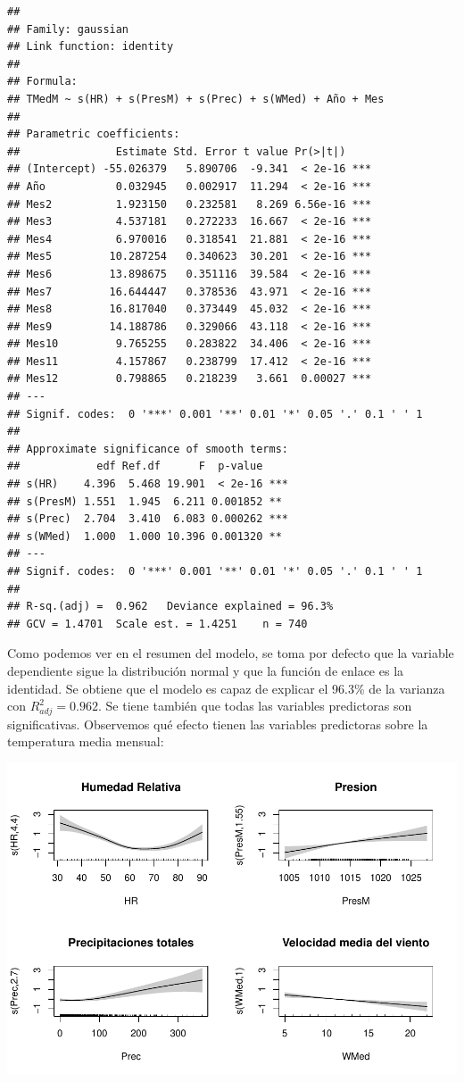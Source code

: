 \documentclass[12pt,a4paper,]{book}
\numberwithin{dummy}{section}
\theoremstyle{ocrenumbox}
\theoremstyle{blacknumex}
\theoremstyle{blacknumbox}
\theoremstyle{ocrenum}
\theoremstyle{ocrenum}
\begin{document}
\begin{verbatim}
## 
## Family: gaussian 
## Link function: identity 
## 
## Formula:
## TMedM ~ s(HR) + s(PresM) + s(Prec) + s(WMed) + Año + Mes
## 
## Parametric coefficients:
##               Estimate Std. Error t value Pr(>|t|)    
## (Intercept) -55.026379   5.890706  -9.341  < 2e-16 ***
## Año           0.032945   0.002917  11.294  < 2e-16 ***
## Mes2          1.923150   0.232581   8.269 6.56e-16 ***
## Mes3          4.537181   0.272233  16.667  < 2e-16 ***
## Mes4          6.970016   0.318541  21.881  < 2e-16 ***
## Mes5         10.287254   0.340623  30.201  < 2e-16 ***
## Mes6         13.898675   0.351116  39.584  < 2e-16 ***
## Mes7         16.644447   0.378536  43.971  < 2e-16 ***
## Mes8         16.817040   0.373449  45.032  < 2e-16 ***
## Mes9         14.188786   0.329066  43.118  < 2e-16 ***
## Mes10         9.765255   0.283822  34.406  < 2e-16 ***
## Mes11         4.157867   0.238799  17.412  < 2e-16 ***
## Mes12         0.798865   0.218239   3.661  0.00027 ***
## ---
## Signif. codes:  0 '***' 0.001 '**' 0.01 '*' 0.05 '.' 0.1 ' ' 1
## 
## Approximate significance of smooth terms:
##            edf Ref.df      F  p-value    
## s(HR)    4.396  5.468 19.901  < 2e-16 ***
## s(PresM) 1.551  1.945  6.211 0.001852 ** 
## s(Prec)  2.704  3.410  6.083 0.000262 ***
## s(WMed)  1.000  1.000 10.396 0.001320 ** 
## ---
## Signif. codes:  0 '***' 0.001 '**' 0.01 '*' 0.05 '.' 0.1 ' ' 1
## 
## R-sq.(adj) =  0.962   Deviance explained = 96.3%
## GCV = 1.4701  Scale est. = 1.4251    n = 740
\end{verbatim}

Como podemos ver en el resumen del modelo, se toma por defecto que la
variable dependiente sigue la distribución normal y que la función de
enlace es la identidad. Se obtiene que el modelo es capaz de explicar el
96.3\% de la varianza con \(R^2_{adj}=0.962\). Se tiene también que
todas las variables predictoras son significativas. Observemos qué
efecto tienen las variables predictoras sobre la temperatura media
mensual:

\begin{center}\includegraphics[width=0.95\linewidth]{figurasR/unnamed-chunk-8-1} \end{center}
\end{document}

